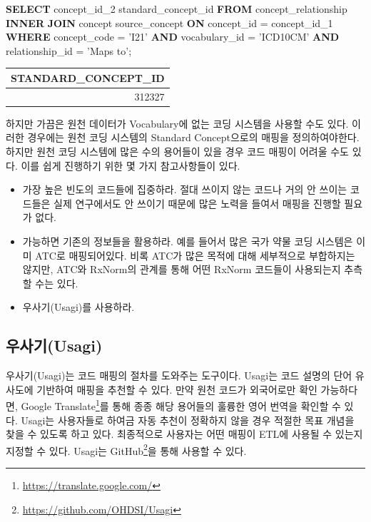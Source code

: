 \documentclass[11pt]{book}
\newenvironment{Shaded}{\begin{snugshade}}{\end{snugshade}}
\newcommand{\KeywordTok}[1]{\textcolor[rgb]{0.13,0.29,0.53}{\textbf{#1}}}
\newcommand{\DecValTok}[1]{\textcolor[rgb]{0.00,0.00,0.81}{#1}}
\newcommand{\StringTok}[1]{\textcolor[rgb]{0.31,0.60,0.02}{#1}}
\newcommand{\NormalTok}[1]{#1}
\providecommand{\tightlist}{%
  \setlength{\itemsep}{0pt}\setlength{\parskip}{0pt}}
\let\rmarkdownfootnote\footnote%
\def\footnote{\protect\rmarkdownfootnote}
\theoremstyle{definition}
\theoremstyle{definition}
\theoremstyle{definition}
\theoremstyle{remark}
\begin{document}
\begin{Shaded}
\begin{Highlighting}[]
\KeywordTok{SELECT}\NormalTok{ concept_id_2 standard_concept_id}
\KeywordTok{FROM}\NormalTok{ concept_relationship}
\KeywordTok{INNER} \KeywordTok{JOIN}\NormalTok{ concept source_concept}
  \KeywordTok{ON}\NormalTok{ concept_id = concept_id_}\DecValTok{1}
\KeywordTok{WHERE}\NormalTok{ concept_code = }\StringTok{'I21'}
  \KeywordTok{AND}\NormalTok{ vocabulary_id = }\StringTok{'ICD10CM'}
  \KeywordTok{AND}\NormalTok{ relationship_id = }\StringTok{'Maps to'}\NormalTok{; }
\end{Highlighting}
\end{Shaded}

\begin{longtable}[]{@{}r@{}}
\toprule
STANDARD\_CONCEPT\_ID\tabularnewline
\midrule
\endhead
312327\tabularnewline
\bottomrule
\end{longtable}

하지만 가끔은 원천 데이터가 Vocabulary에 없는 코딩 시스템을 사용할 수도
있다. 이러한 경우에는 원천 코딩 시스템의 Standard Concept으로의 매핑을
정의하여야한다. 하지만 원천 코딩 시스템에 많은 수의 용어들이 있을 경우
코드 매핑이 어려울 수도 있다. 이를 쉽게 진행하기 위한 몇 가지
참고사항들이 있다.

\begin{itemize}
\tightlist
\item
  가장 높은 빈도의 코드들에 집중하라. 절대 쓰이지 않는 코드나 거의 안
  쓰이는 코드들은 실제 연구에서도 안 쓰이기 때문에 많은 노력을 들여서
  매핑을 진행할 필요가 없다.
\item
  가능하면 기존의 정보들을 활용하라. 예를 들어서 많은 국가 약물 코딩
  시스템은 이미 ATC로 매핑되어있다. 비록 ATC가 많은 목적에 대해
  세부적으로 부합하지는 않지만, ATC와 RxNorm의 관계를 통해 어떤 RxNorm
  코드들이 사용되는지 추측할 수는 있다.
\item
  우사기(Usagi)를 사용하라.
\end{itemize}

\subsection{우사기(Usagi)}\label{usagi}

우사기(Usagi)는 코드 매핑의 절차를 도와주는 도구이다. Usagi는 코드
설명의 단어 유사도에 기반하여 매핑을 추천할 수 있다. 만약 원천 코드가
외국어로만 확인 가능하다면, Google Translate\footnote{\url{https://translate.google.com/}}를
통해 종종 해당 용어들의 훌륭한 영어 번역을 확인할 수 있다. Usagi는
사용자들로 하여금 자동 추천이 정확하지 않을 경우 적절한 목표 개념을 찾을
수 있도록 하고 있다. 최종적으로 사용자는 어떤 매핑이 ETL에 사용될 수
있는지 지정할 수 있다. Usagi는 GitHub\footnote{\url{https://github.com/OHDSI/Usagi}}을
통해 사용할 수 있다. 
\end{document}
